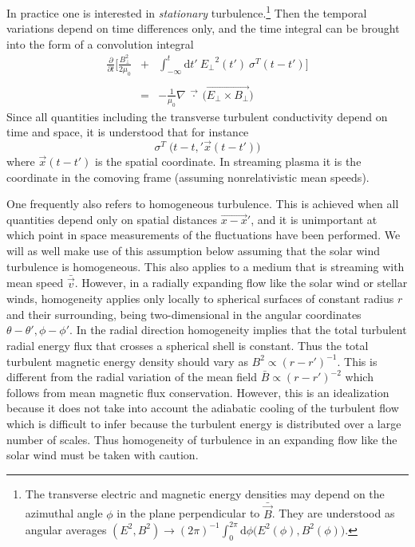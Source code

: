 \documentclass[ ]{copernicus2}
\begin{document}
{{In practice one is interested in \emph{stationary} turbulence.\footnote{{The transverse electric and magnetic energy densities may depend on the azimuthal angle $\phi$ in the plane perpendicular to $\bar{\vec{B}}$. They are understood as angular averages $(E^2,B^2)\to (2\pi)^{-1} \int_0^{2\pi}\mathrm{d}\phi \big(E^2(\phi),B^2(\phi)\big)$.}}  Then the temporal  variations depend on time differences only, and the time integral} can be brought into the form of a convolution integral
\begin{eqnarray}\label{eq-energy}
\frac{\partial}{\partial t}\bigg[\frac{B_\perp^2}{2\mu_0}&+&\!\!\!\!\int_{-\infty}^t\!\!\!\!\!\!\!\!\!\!\!\!\mathrm{d}t'\ {E_\perp}^2(t')\ {\sigma}^T(t-t') \bigg]\!\nonumber \\[-1.5ex]
&&\\[-1.5ex]
&=& -\frac{1}{\mu_0}\nabla\ \vec{\cdot}\ \Big(\vec{E_\perp\times B_\perp}\Big)\nonumber
\end{eqnarray}
{Since all quantities including the transverse turbulent conductivity depend on time and space, it is understood that for instance
\begin{equation}
\sigma^T\;\Big(t-t,' \vec{x}(t-t')\Big)
\end{equation}
where $\vec{x}(t-t')$ is the spatial coordinate. In streaming plasma it is the coordinate in the comoving frame (assuming nonrelativistic mean speeds).}

One frequently also refers to homogeneous turbulence. This is achieved when all quantities depend only on spatial distances $\vec{x-x}'$, and it is unimportant at which point in space measurements of the fluctuations have been performed. We will as well make use of this assumption below assuming that the solar wind turbulence is homogeneous. This also applies to a medium that is streaming with mean speed $\bar{\vec{v}}$. However, in a radially expanding flow like the solar wind or stellar winds, homogeneity applies only locally to spherical surfaces of constant radius $r$ and their surrounding, being two-dimensional in the angular coordinates $\theta-\theta', \phi-\phi'$. In the radial direction homogeneity implies that the total turbulent radial energy flux that crosses a spherical shell is constant. Thus the total turbulent magnetic energy density should vary as $B^2\propto (r-r')^{-1}$. This is different from the radial variation of the mean field $\bar{B}\propto (r-r')^{-2}$ which follows from mean magnetic flux conservation.  However, this is an idealization because it does not take into account the adiabatic cooling of the turbulent flow which is difficult to infer because the turbulent energy is distributed over a large number of scales. Thus homogeneity of turbulence in an expanding flow like the solar wind must be taken with caution.



}
\end{document}
